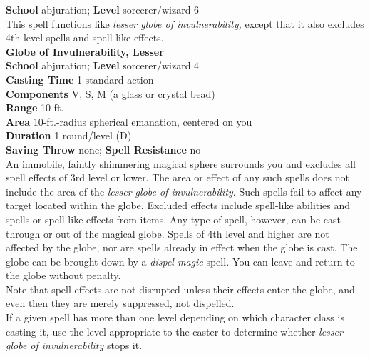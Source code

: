 \textbf{School} abjuration; \textbf{Level} sorcerer/wizard 6\\
This spell functions like \textit{lesser globe of invulnerability, }except that it also excludes 4th-level spells and spell-like effects.\\
\textbf{Globe of Invulnerability, Lesser}\\
\textbf{School} abjuration; \textbf{Level} sorcerer/wizard 4\\
\textbf{Casting Time} 1 standard action\\
\textbf{Components} V, S, M (a glass or crystal bead)\\
\textbf{Range} 10 ft.\\
\textbf{Area} 10-ft.-radius spherical emanation, centered on you\\
\textbf{Duration} 1 round/level (D)\\
\textbf{Saving Throw} none; \textbf{Spell Resistance} no\\
An immobile, faintly shimmering magical sphere surrounds you and excludes all spell effects of 3rd level or lower. The area or effect of any such spells does not include the area of the \textit{lesser globe of invulnerability}. Such spells fail to affect any target located within the globe. Excluded effects include spell-like abilities and spells or spell-like effects from items. Any type of spell, however, can be cast through or out of the magical globe. Spells of 4th level and higher are not affected by the globe, nor are spells already in effect when the globe is cast. The globe can be brought down by a \textit{dispel magic }spell\textit{. }You can leave and return to the globe without penalty.\\
Note that spell effects are not disrupted unless their effects enter the globe, and even then they are merely suppressed, not dispelled. \\
If a given spell has more than one level depending on which character class is casting it, use the level appropriate to the caster to determine whether \textit{lesser globe of invulnerability }stops it.\\
